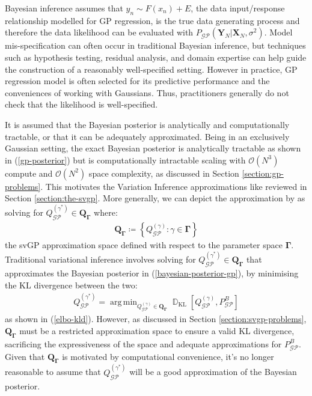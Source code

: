 \documentclass{article}
\newcommand{\D}{\operatorname{\mathbb{D}}}
\newcommand{\GP}{\operatorname{\mathcal{GP}}}
\DeclareMathOperator*{\argmin}{arg\,min}
\numberwithin{equation}{section}
\begin{document}
 Bayesian inference assumes that $y_n \sim F(x_n) + E$, the data input/response relationship modelled for GP regression, is the true data generating process and therefore the data likelihood can be evaluated with $P_{\GP}\left(\mathbf{Y}_N \vert \mathbf{X}_N, \sigma^2\right)$. Model mis-specification can often occur in traditional Bayesian inference, but techniques such as hypothesis testing, residual analysis, and domain expertise can help guide the construction of a reasonably well-specified setting. However in practice, GP regression model is often selected for its predictive performance and the conveniences of working with Gaussians. Thus, practitioners generally do not check that the likelihood is well-specified.

It is assumed that the Bayesian posterior is analytically and computationally tractable, or that it can be adequately approximated. Being in an exclusively Gaussian setting, the exact Bayesian posterior is analytically tractable as shown in (\ref{gp-posterior}) but is computationally intractable scaling with $\mathcal{O}(N^3)$ compute and $\mathcal{O}(N^2)$ space complexity, as discussed in Section \ref{section:gp-problems}. This motivates the Variation Inference approximations like \cite{titsias2009variational} reviewed in Section \ref{section:the-svgp}. More generally, we can depict the approximation by \cite{titsias2009variational} as solving for $Q_{\GP}^{(\gamma^*)} \in \boldsymbol{Q}_{\mathbf{\Gamma}}$ where:
\begin{align}
    \boldsymbol{Q}_{\boldsymbol{\Gamma}} \coloneqq \left\{Q_{\GP}^{(\gamma)}: \gamma \in \mathbf{\Gamma}\right\}
    \label{svgp-space}
\end{align}
the svGP approximation space defined with respect to the parameter space $\mathbf{\Gamma}$. Traditional variational inference involves solving for $Q_{\GP}^{(\gamma^*)} \in \boldsymbol{Q}_{\boldsymbol{\Gamma}}$ that approximates the Bayesian posterior in (\ref{bayesian-posterior-gp}), by minimising the KL divergence between the two:
\begin{align}
Q^{(\gamma^*)}_{\GP} = \argmin_{Q^{(\gamma)}_{\GP} \in \boldsymbol{Q}_{\boldsymbol{\Gamma}}}\D_{\text{KL}}\left[Q_{\GP}^{(\gamma)}, P_{\GP}^B\right]
\end{align}
as shown in (\ref{elbo-kld}).
However, as discussed in Section \ref{section:svgp-problems}, $\boldsymbol{Q}_{\boldsymbol{\Gamma}}$ must be a restricted approximation space to ensure a valid KL divergence, sacrificing the expressiveness of the space and adequate approximations for $P_{\GP}^B$. Given that $\boldsymbol{Q}_{\boldsymbol{\Gamma}}$ is motivated by computational convenience, it's no longer reasonable to assume that $Q_{\GP}^{(\gamma^*)}$ will be a good approximation of the Bayesian posterior.
\end{document}
